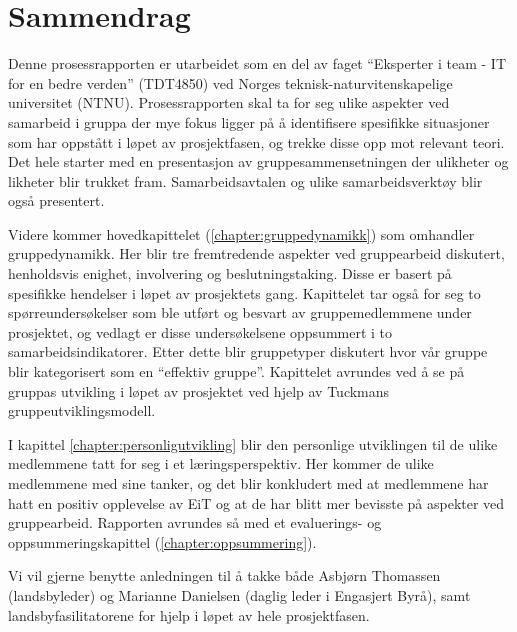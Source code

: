 \section*{Sammendrag}

Denne prosessrapporten er utarbeidet som en del av faget ``Eksperter i team - IT for en bedre verden'' (TDT4850) ved Norges teknisk-naturvitenskapelige universitet (NTNU). Prosessrapporten skal ta for seg ulike aspekter ved samarbeid i gruppa der mye fokus ligger på å identifisere spesifikke situasjoner som har oppstått i løpet av prosjektfasen, og trekke disse opp mot relevant teori. Det hele starter med en presentasjon av gruppesammensetningen der ulikheter og likheter blir trukket fram. Samarbeidsavtalen og ulike samarbeidsverktøy blir også presentert.

Videre kommer hovedkapittelet (\ref{chapter:gruppedynamikk}) som omhandler gruppedynamikk. Her blir tre fremtredende aspekter ved gruppearbeid diskutert, henholdsvis enighet, involvering og beslutningstaking. Disse er basert på spesifikke hendelser i løpet av prosjektets gang. Kapittelet tar også for seg to spørreundersøkelser som ble utført og besvart av gruppemedlemmene under prosjektet, og vedlagt er disse undersøkelsene oppsummert i to samarbeidsindikatorer. Etter dette blir gruppetyper diskutert hvor vår gruppe blir kategorisert som en “effektiv gruppe”. Kapittelet avrundes ved å se på gruppas utvikling i løpet av prosjektet ved hjelp av Tuckmans gruppeutviklingsmodell.

I kapittel \ref{chapter:personligutvikling} blir den personlige utviklingen til de ulike medlemmene tatt for seg i et læringsperspektiv. Her kommer de ulike medlemmene med sine tanker, og det blir konkludert med at medlemmene har hatt en positiv opplevelse av EiT og at de har blitt mer bevisste på aspekter ved gruppearbeid. Rapporten avrundes så med et evaluerings- og oppsummeringskapittel (\ref{chapter:oppsummering}).

Vi vil gjerne benytte anledningen til å takke både Asbjørn Thomassen (landsbyleder) og Marianne Danielsen (daglig leder i Engasjert Byrå), samt landsbyfasilitatorene for hjelp i løpet av hele prosjektfasen.
